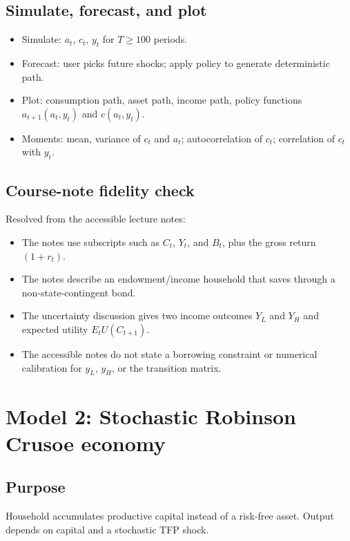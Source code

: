 \documentclass[11pt]{article}
\begin{document}
\subsection{Simulate, forecast, and plot}
\begin{itemize}
    \item Simulate: $a_t$, $c_t$, $y_t$ for $T \geq 100$ periods.
    \item Forecast: user picks future shocks; apply policy to generate deterministic path.
    \item Plot: consumption path, asset path, income path, policy functions $a_{t+1}(a_t,y_t)$ and $c(a_t,y_t)$.
    \item Moments: mean, variance of $c_t$ and $a_t$; autocorrelation of $c_t$; correlation of $c_t$ with $y_t$.
\end{itemize}

\subsection{Course-note fidelity check}

\begin{warningbox}
Resolved from the accessible lecture notes:
\begin{itemize}
    \item The notes use subscripts such as $C_t$, $Y_t$, and $B_t$, plus the gross return $(1+r_t)$.
    \item The notes describe an endowment/income household that saves through a non-state-contingent bond.
    \item The uncertainty discussion gives two income outcomes $Y_L$ and $Y_H$ and expected utility $E_t U(C_{t+1})$.
    \item The accessible notes do not state a borrowing constraint or numerical calibration for $y_L$, $y_H$, or the transition matrix.
\end{itemize}
\end{warningbox}

\bigskip
\section{Model 2: Stochastic Robinson Crusoe economy}

\subsection{Purpose}
Household accumulates productive capital instead of a risk-free asset. Output depends on capital and a stochastic TFP shock.
\end{document}
